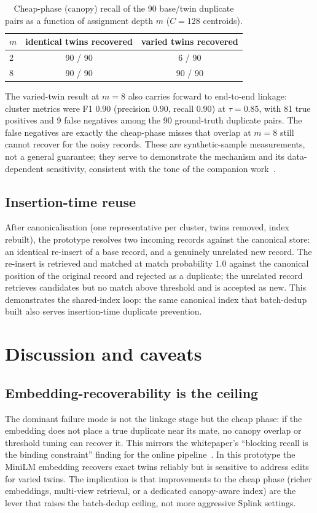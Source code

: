 \documentclass[11pt]{article}
\begin{document}
\begin{table}[h]
\centering
\caption{Cheap-phase (canopy) recall of the 90 base/twin duplicate pairs as a function of
assignment depth $m$ ($C=128$ centroids).}
\label{tab:cheap-recall}
\begin{tabular}{lcc}
\toprule
$m$ & identical twins recovered & varied twins recovered \\
\midrule
2 & 90 / 90 & 6 / 90 \\
8 & 90 / 90 & 90 / 90 \\
\bottomrule
\end{tabular}
\end{table}

The varied-twin result at $m=8$ also carries forward to end-to-end linkage: cluster metrics
were F1 $0.90$ (precision $0.90$, recall $0.90$) at $\tau=0.85$, with 81 true positives and 9
false negatives among the 90 ground-truth duplicate pairs. The false negatives are exactly
the cheap-phase misses that overlap at $m=8$ still cannot recover for the noisy records.
These are synthetic-sample measurements, not a general guarantee; they serve to demonstrate
the mechanism and its data-dependent sensitivity, consistent with the tone of the companion
work~\cite{pipeline,paradox}.

\subsection{Insertion-time reuse}
After canonicalisation (one representative per cluster, twins removed, index rebuilt), the
prototype resolves two incoming records against the canonical store: an identical re-insert of
a base record, and a genuinely unrelated new record. The re-insert is retrieved and matched at
match probability $1.0$ against the canonical position of the original record and rejected as a
duplicate; the unrelated record retrieves candidates but no match above threshold and is
accepted as new. This demonstrates the shared-index loop: the same canonical index that
batch-dedup built also serves insertion-time duplicate prevention.

\section{Discussion and caveats}
\label{sec:caveats}

\subsection{Embedding-recoverability is the ceiling}
The dominant failure mode is not the linkage stage but the cheap phase: if the embedding does
not place a true duplicate near its mate, no canopy overlap or threshold tuning can recover it.
This mirrors the whitepaper's ``blocking recall is the binding constraint'' finding for the
online pipeline~\cite{pipeline}. In this prototype the MiniLM embedding recovers exact twins
reliably but is sensitive to address edits for varied twins. The implication is that
improvements to the cheap phase (richer embeddings, multi-view retrieval, or a dedicated
canopy-aware index) are the lever that raises the batch-dedup ceiling, not more aggressive
Splink settings.
\end{document}
